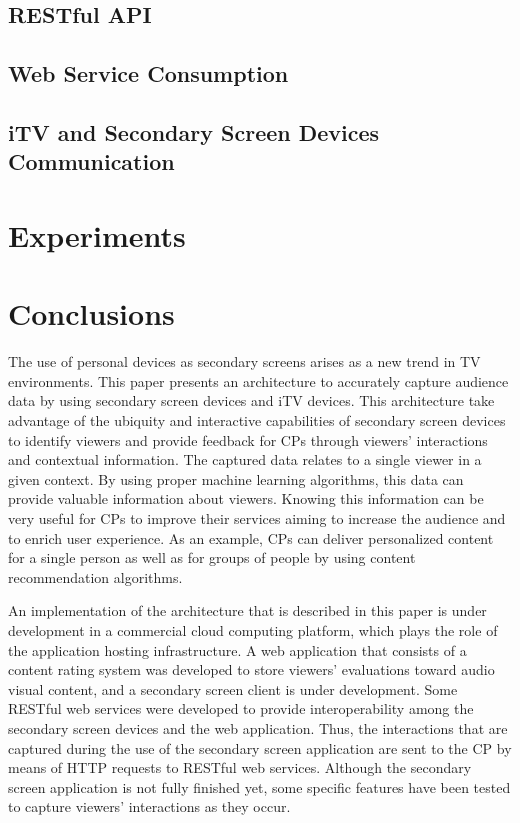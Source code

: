 \documentclass[journal]{IEEEtran}
\begin{document}
\subsection{RESTful API}

\subsection{Web Service Consumption}

\subsection{iTV and Secondary Screen Devices Communication}

\section{Experiments}

\section{Conclusions}

The use of personal devices as secondary screens arises as a new trend in TV environments. This paper presents an architecture to accurately capture audience data by using secondary screen devices and iTV devices. This architecture take advantage of the ubiquity and interactive capabilities of secondary screen devices to identify viewers and provide feedback for CPs through viewers' interactions and contextual information. The captured data relates to a single viewer in a given context. By using proper machine learning algorithms, this data can provide valuable information about viewers. Knowing this information can be very useful for CPs to improve their services aiming to increase the audience and to enrich user experience. As an example, CPs can deliver personalized content for a single person as well as for groups of people by using content recommendation algorithms.

An implementation of the architecture that is described in this paper is under development in a commercial cloud computing platform, which plays the role of the application hosting infrastructure. A web application that consists of a content rating system was developed to store  viewers' evaluations toward audio visual content, and a secondary screen client is under development. Some RESTful web services were developed to provide interoperability among the secondary screen devices and the web application. Thus, the interactions that are captured during the use of the secondary screen application are sent to the CP by means of HTTP requests to RESTful web services. Although the secondary screen application is not fully finished yet, some specific features have been tested to capture viewers' interactions as they occur.
\end{document}
